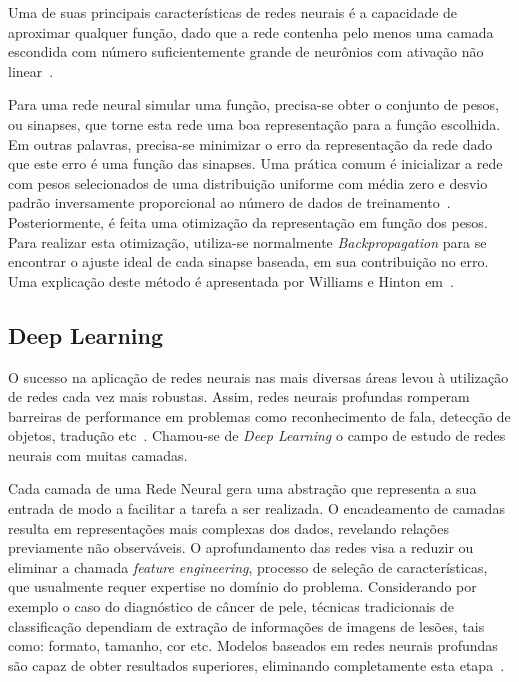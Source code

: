 Uma de suas principais características de redes neurais é a capacidade de aproximar qualquer função, dado que a rede contenha pelo menos uma camada escondida com número suficientemente grande de neurônios com ativação não linear~\cite{hornik89}.

Para uma rede neural simular uma função, precisa-se obter o conjunto de pesos, ou sinapses, que torne esta rede uma boa representação para a função escolhida. Em outras palavras, precisa-se minimizar o erro da representação da rede dado que este erro é uma função das sinapses. Uma prática comum é inicializar a rede com pesos selecionados de uma distribuição uniforme com média zero e desvio padrão inversamente proporcional ao número de dados de treinamento~\cite{lecun12}. Posteriormente, é feita uma otimização da representação em função dos pesos. Para realizar esta otimização, utiliza-se normalmente \textit{Backpropagation} para se encontrar o ajuste ideal de cada sinapse baseada, em sua contribuição no erro. Uma explicação deste método é apresentada por Williams e Hinton em~\cite{williams86}.


\subsection{Deep Learning}

O sucesso na aplicação de redes neurais nas mais diversas áreas levou à utilização de redes cada vez mais robustas. Assim, redes neurais profundas romperam barreiras de performance em problemas como reconhecimento de fala, detecção de objetos, tradução etc~\cite{lecun15}. Chamou-se de \textit{Deep Learning} o campo de estudo de redes neurais com muitas camadas.

Cada camada de uma Rede Neural gera uma abstração que representa a sua entrada de modo a facilitar a tarefa a ser realizada. O encadeamento de camadas resulta em representações mais complexas dos dados, revelando relações previamente não observáveis. O aprofundamento das redes visa a reduzir ou eliminar a chamada \textit{feature engineering}, processo de seleção de características, que usualmente requer expertise no domínio do problema. Considerando por exemplo o caso do diagnóstico de câncer de pele, técnicas tradicionais de classificação dependiam de extração de informações de imagens de lesões, tais como: formato, tamanho, cor etc. Modelos baseados em redes neurais profundas são capaz de obter resultados superiores, eliminando completamente esta etapa~\cite{esteva17}.


